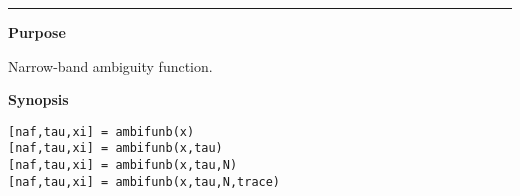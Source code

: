 

\hspace*{-1.6cm}{\Large \bf ambifunb}

\vspace*{-.4cm}
\hspace*{-1.6cm}\rule[0in]{16.5cm}{.02cm}
\vspace*{.2cm}


{\bf \large {}\selectfont Purpose}\\
\hspace*{1.5cm}
\begin{minipage}[t]{13.5cm}
Narrow-band ambiguity function.
\end{minipage}
\vspace*{.5cm}


{\bf \large {}\selectfont Synopsis}\\
\hspace*{1.5cm}
\begin{minipage}[t]{13.5cm}
\begin{verbatim}
[naf,tau,xi] = ambifunb(x)
[naf,tau,xi] = ambifunb(x,tau)
[naf,tau,xi] = ambifunb(x,tau,N)
[naf,tau,xi] = ambifunb(x,tau,N,trace)
\end{verbatim}
\end{minipage}
\vspace*{.5cm}


